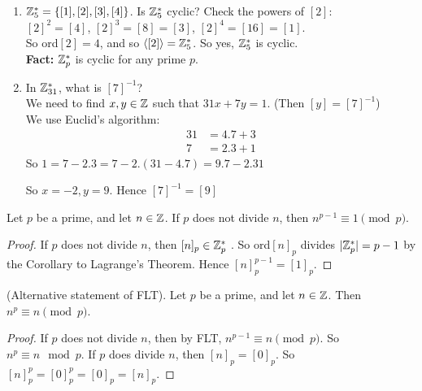 \documentclass[10pt]{scrartcl}
\begin{document}
 
\begin{examples} \begin{enumerate}
 \item 	 {} 
 $\mathbb{Z}_5^* = \{[1],[2],[3],[4]\}$. Is $\mathbb{Z}_5^*$ cyclic? Check the powers of $[2]$:\\ $[2]^2 = [4]$, $[2]^3 = [8] = [3]$, $[2]^4 = [16] = [1]$.\\
  
  So ord$[2] = 4$, and so $\langle[2]\rangle = \mathbb{Z}_5^*$. So yes, $\mathbb{Z}_5^*$ is cyclic.\\
 
 \textbf{Fact:} $\mathbb{Z}_p^*$ is cyclic for any prime $p$.
 \item In $\mathbb{Z}_{31}^*$, what is $[7]^{-1}$?\\
 We need to find $x,y \in \mathbb{Z}$ such that $31x + 7y = 1$. (Then $[y] = [7]^{-1}$)\\ We use Euclid's algorithm:
\begin{align*}
   31 &= 4.7 + 3\\
 7 &= 2.3 + 1
\end{align*}
 So $1 = 7 - 2.3  = 7-2.(31-4.7) = 9.7 - 2.31$
 
 So $x = -2,y=9$. Hence $[7]^{-1} = [9]$
 \end{enumerate}
 \end{examples}\vspace*{10pt}

\begin{theorem}  Let $p$ be a prime, and let $n \in \mathbb{Z}$. If $p$ does not divide $n$, then $n^{p-1} \equiv 1 \pmod{p}$.	
\end{theorem}

\begin{proof}
If $p$ does not divide $n$, then $[n]_p \in \mathbb{Z}_p^*$	. So ord$[n]_p$ divides $|\mathbb{Z}_p^*| = p-1$ by the Corollary to Lagrange's Theorem. Hence $[n]_p^{p-1} = [1]_p$. 
\end{proof}\vspace*{5pt}

\begin{corollary} (Alternative statement of FLT). Let $p$ be a prime, and let $n \in \mathbb{Z}$. Then $n^p \equiv n \pmod{p}$.
	
\end{corollary}

\begin{proof}
If $p$ does not divide $n$, then by FLT, $n^{p-1} \equiv n \pmod{p}.$  So $n^p \equiv n \mod p.$ If $p$ does divide $n$, then $[n]_p = [0]_p$. So $[n]_p^p = [0]_p^p = [0]_p = [n]_p$.	
\end{proof}\vspace*{5pt}
\end{document}
